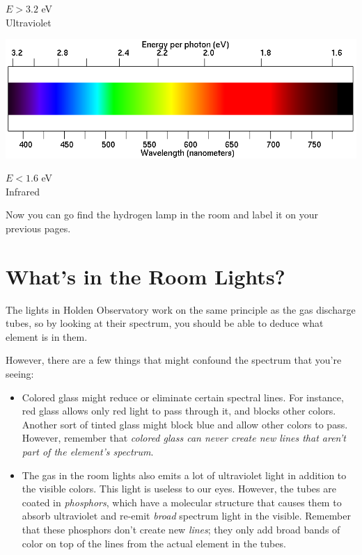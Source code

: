 \documentclass[11pt]{article}
\begin{document}
\begin{landscape}
	\bigskip
	
	\begin{minipage}{1in}
		\large
		$E > 3.2$ eV\\
		Ultraviolet
	\end{minipage}
	\begin{minipage}{8in}
		\includegraphics[width=\textwidth]{spectrum2.png}
	\end{minipage}
	\begin{minipage}{1in}
		$E < 1.6$ eV\\
		Infrared
	\end{minipage}
	
	
	\vspace{1in}
	
	Now you can go find the hydrogen lamp in the room and label it on your previous pages.
	
\end{landscape}

\section{ What's in the Room Lights?}

The lights in Holden Observatory work on the same principle as the gas discharge tubes, so by looking at their
spectrum, you should be able to deduce what element is in them.

However, there are a few things that might confound the spectrum that you're seeing:

\begin{itemize}


\item Colored glass might reduce or eliminate certain spectral lines. For instance, red glass allows only red light to pass through it, and blocks other colors. Another sort of tinted glass might block blue and allow other colors to pass. However, remember that {\it colored glass can never create new lines that aren't part of the element's spectrum}.

\item The gas in the room lights also emits a lot of ultraviolet light in addition to the visible colors. This light is useless to our eyes. However, the tubes are coated in {\it phosphors}, which have a molecular structure that causes them to absorb ultraviolet and re-emit {\it broad} spectrum light in the visible. Remember that these phosphors don't create new {\it lines}; they only add broad bands of color on top of the lines from the actual element in the tubes.

\end{itemize}
\end{document}

